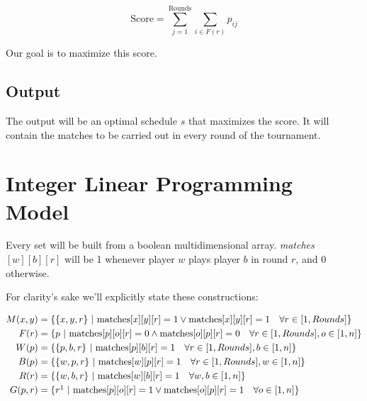\documentclass[a4paper, 10pt]{article}
\begin{document}
\begin{equation}
    \text{Score} = \sum_{j = 1}^{\text{Rounds}} \sum_{i \in F(r)}  p_{ij}
    \label{objfunc}
\end{equation}


Our goal is to maximize this score.






\subsection{Output}
The output will be an optimal schedule $s$ that maximizes the score. It will contain the matches to be carried out in every round of the tournament.

\clearpage

\section{Integer Linear Programming Model}
Every set will be built from a boolean multidimensional array. \textit{matches}$[w][b][r]$ will be 1 whenever player $w$ plays player $b$ in round $r$, and 0 otherwise.


For clarity's sake we'll explicitly state these constructions:

\begin{align*}
    M(x, y)   &= \{ \{x, y, r\} \ | \ \text{matches}[x][y][r] = 1 \lor \text{matches}[x][y][r] = 1 \quad \forall r \in [1, Rounds]\}\\
    F(r)      &= \{ p \ | \ \text{matches}[p][o][r] = 0 \land \text{matches}[o][p][r] = 0 \quad \forall r \in [1, Rounds], o \in [1, n]\}\\
    W(p)      &= \{ \{p, b, r\} \ | \ \text{matches}[p][b][r] = 1  \quad \forall r \in [1, Rounds], b \in [1, n]\}\\
    B(p)      &= \{ \{w, p, r\} \ | \ \text{matches}[w][p][r] = 1  \quad \forall r \in [1, Rounds], w \in [1, n]\}\\
    R(r)      &= \{ \{w, b, r\} \ | \ \text{matches}[w][b][r] = 1  \quad \forall w, b \in [1, n]\}\\
    G(p, r)   &= \{ r\footnotemark \ | \ \text{matches}[p][o][r] = 1  \lor \text{matches}[o][p][r] = 1 \quad \forall o \in [1, n]\}\\
\end{align*}
\end{document}
